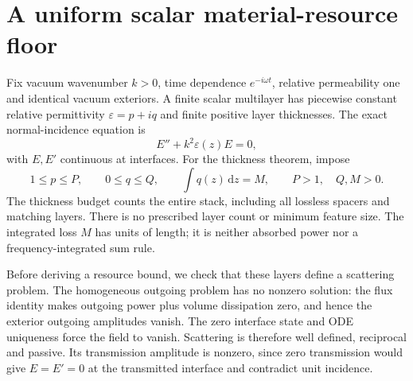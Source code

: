 \documentclass[11pt,a4paper]{article}
\theoremstyle{remark}
\newcommand{\dd}{\,\mathrm d}
\begin{document}
\section{A uniform scalar material-resource floor}\label{sec:floor}
Fix vacuum wavenumber $k>0$, time dependence $e^{-i\omega t}$, relative permeability one and identical vacuum exteriors. A finite scalar multilayer has piecewise constant relative permittivity $\varepsilon=p+iq$ and finite positive layer thicknesses. The exact normal-incidence equation is
\begin{equation}\label{eq:helmholtz}
 E''+k^2\varepsilon(z)E=0,
\end{equation}
with $E,E'$ continuous at interfaces. For the thickness theorem, impose
\begin{equation}\label{eq:material}
 1\leq p\leq P,\qquad 0\leq q\leq Q,\qquad
 \int q(z)\dd z=M,\qquad P>1,\quad Q,M>0.
\end{equation}
The thickness budget counts the entire stack, including all lossless spacers and matching layers. There is no prescribed layer count or minimum feature size. The integrated loss $M$ has units of length; it is neither absorbed power nor a frequency-integrated sum rule.

Before deriving a resource bound, we check that these layers define a scattering problem. The homogeneous outgoing problem has no nonzero solution: the flux identity makes outgoing power plus volume dissipation zero, and hence the exterior outgoing amplitudes vanish. The zero interface state and ODE uniqueness force the field to vanish. Scattering is therefore well defined, reciprocal and passive. Its transmission amplitude is nonzero, since zero transmission would give $E=E'=0$ at the transmitted interface and contradict unit incidence.
\end{document}
